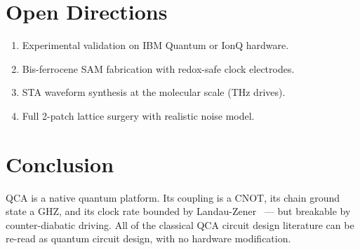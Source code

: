 \documentclass[11pt,aps,prl,twocolumn]{revtex4-2}
\begin{document}
\section{Open Directions}

\begin{enumerate}
\item Experimental validation on IBM Quantum or IonQ hardware.
\item Bis-ferrocene SAM fabrication with redox-safe clock electrodes.
\item STA waveform synthesis at the molecular scale (THz drives).
\item Full 2-patch lattice surgery with realistic noise model.
\end{enumerate}

\section{Conclusion}

QCA is a native quantum platform.  Its coupling is a CNOT, its
chain ground state a GHZ, and its clock rate bounded by
Landau-Zener~\cite{landau1932zur,zener1932non} — but breakable by counter-diabatic driving.  All of
the classical QCA circuit design literature can be re-read as
quantum circuit design, with no hardware modification.




\end{document}
